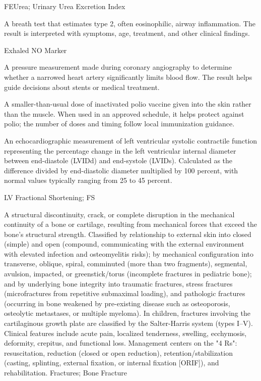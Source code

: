 \synonyms
FEUrea; Urinary Urea Excretion Index

 A breath test that estimates type 2, often eosinophilic, airway inflammation. The result is interpreted with symptoms, age, treatment, and other clinical findings.

\synonyms
Exhaled NO Marker

 A pressure measurement made during coronary angiography to determine whether a narrowed heart artery significantly limits blood flow. The result helps guide decisions about stents or medical treatment.

 A smaller-than-usual dose of inactivated polio vaccine given into the skin rather than the muscle. When used in an approved schedule, it helps protect against polio; the number of doses and timing follow local immunization guidance.

 An echocardiographic measurement of left ventricular systolic contractile function representing the percentage change in the left ventricular internal diameter between end-diastole (LVIDd) and end-systole (LVIDs). Calculated as the difference divided by end-diastolic diameter multiplied by 100 percent, with normal values typically ranging from 25 to 45 percent.

\synonyms
LV Fractional Shortening; FS

 A structural discontinuity, crack, or complete disruption in the mechanical continuity of a bone or cartilage, resulting from mechanical forces that exceed the bone’s structural strength. Classified by relationship to external skin into closed (simple) and open (compound, communicating with the external environment with elevated infection and osteomyelitis risks); by mechanical configuration into transverse, oblique, spiral, comminuted (more than two fragments), segmental, avulsion, impacted, or greenstick/torus (incomplete fractures in pediatric bone); and by underlying bone integrity into traumatic fractures, stress fractures (microfractures from repetitive submaximal loading), and pathologic fractures (occurring in bone weakened by pre-existing disease such as osteoporosis, osteolytic metastases, or multiple myeloma). In children, fractures involving the cartilaginous growth plate are classified by the Salter-Harris system (types I--V). Clinical features include acute pain, localized tenderness, swelling, ecchymosis, deformity, crepitus, and functional loss. Management centers on the "4 Rs": resuscitation, reduction (closed or open reduction), retention/stabilization (casting, splinting, external fixation, or internal fixation [ORIF]), and rehabilitation.
\synonyms
Fractures; Bone Fracture

